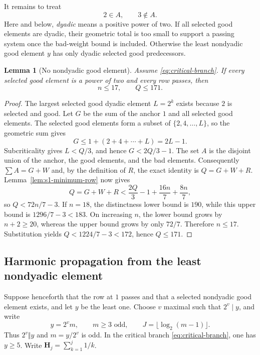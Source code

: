 \documentclass[11pt]{article}
\newtheorem{lemma}[theorem]{Lemma}
\theoremstyle{definition}
\theoremstyle{remark}
\newcommand{\Harm}{\mathbf H}
\begin{document}
It remains to treat
\begin{equation}\label{eq:critical-branch}
 2\in A,\qquad 3\notin A.
\end{equation}
Here and below, \emph{dyadic} means a positive power of two.
If all selected good elements are dyadic, their geometric total
is too small to support a passing system once the bad-weight bound is
included.  Otherwise the least nondyadic good element \(y\) has only dyadic
selected good predecessors.

\begin{lemma}[No nondyadic good element]\label{lem:no-nondyadic}
Assume \eqref{eq:critical-branch}.  If every selected good element is a
power of two and every row passes, then
\[
 n\le17,\qquad Q\le171.
\]
\end{lemma}

\begin{proof}
The largest selected good dyadic element \(L=2^k\) exists because \(2\)
is selected and good.  Let \(G\) be the sum of the anchor \(1\) and all
selected good elements.  The selected good elements form a subset of
\(\{2,4,\ldots,L\}\), so the geometric sum gives
\[
 G\le1+(2+4+\cdots+L)=2L-1.
\]
Subcriticality gives \(L<Q/3\), and hence \(G<2Q/3-1\).  The set \(A\)
is the disjoint union of the anchor, the good elements, and the bad
elements.  Consequently \(\sum A=G+W\) and, by the definition of \(R\),
the exact identity is \(Q=G+W+R\).  Lemma~\ref{lem:s1-minimum-row} now gives
\[
 Q=G+W+R<\frac{2Q}{3}-1+\frac{16n}{7}+\frac{8n}{7},
\]
so \(Q<72n/7-3\).  If \(n=18\), the distinctness lower bound is
\(190\), while this upper bound is \(1296/7-3<183\).  On increasing
\(n\), the lower bound grows by \(n+2\ge20\), whereas the upper bound
grows by only \(72/7\).  Therefore \(n\le17\).  Substitution yields
\(Q<1224/7-3<172\), hence \(Q\le171\).
\end{proof}

\subsection{Harmonic propagation from the least nondyadic element}

Suppose henceforth that the row at \(1\) passes and that a selected
nondyadic good element exists, and let \(y\) be the least one.  Choose
\(v\) maximal such that \(2^v\mid y\), and write
\begin{equation}\label{eq:y-factorization}
 y=2^vm,\qquad m\ge3\text{ odd},\qquad
 J=\lfloor\log_2(m-1)\rfloor.
\end{equation}
Thus \(2^v\Vert y\) and \(m=y/2^v\) is odd.
In the critical branch \eqref{eq:critical-branch}, one has \(y\ge5\).
Write \(\Harm_j=\sum_{k=1}^j1/k\).
\end{document}
